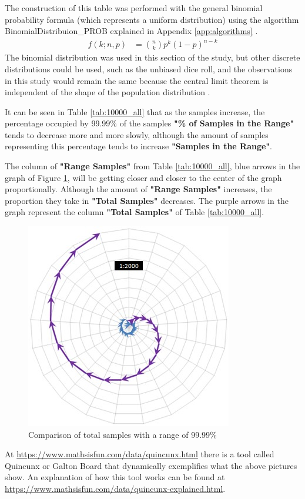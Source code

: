 The construction of this table was performed with the general binomial probability formula (which represents a uniform distribution) using the algorithm \tiny BinomialDistribuion\_PROB \normalsize explained in Appendix \ref{app:algorithms} \cite{mathisfun_binomial_distribution}.
	\begin{align*}
	f(k;n,p) &= \binom{n}{k} p^k(1 - p)^{n-k}
	\end{align*}
The binomial distribution was used in this section of the study, but other discrete distributions could be used, such as the unbiased dice roll, and the observations in this study would remain the same because the central limit theorem is independent of the shape of the population distribution \cite{statisticsbyjim_central_limit_theorem_explainded}.

It can be seen in Table \ref{tab:10000_all} that as the samples increase, the percentage occupied by 99.99\% of the samples \textbf{"\% of Samples in the Range"} tends to decrease more and more slowly, although the amount of samples representing this percentage tends to increase \textbf{"Samples in the Range"}.

The column of \textbf{"Range Samples"} from Table \ref{tab:10000_all}, blue arrows in the graph of Figure \ref{fig:total_comparison_chart_with_99_range}, will be getting closer and closer to the center of the graph proportionally. Although the amount of \textbf{"Range Samples"} increases, the proportion they take in \textbf{"Total Samples"} decreases. The purple arrows in the graph represent the column \textbf{"Total Samples"} of Table \ref{tab:10000_all}. 
	\begin{figure}[H]
	\caption{Comparison of total samples with a range of 99.99\% }
	\label{fig:total_comparison_chart_with_99_range}
	\centering
	\includegraphics[scale=.9]{sections/images/total_comparison_chart_with_99_range.jpg}
	\end{figure}

At \url{https://www.mathsisfun.com/data/quincunx.html} there is a tool called Quincunx or Galton Board that dynamically exemplifies what the above pictures show. An explanation of how this tool works can be found at \url{https://www.mathsisfun.com/data/quincunx-explained.html}. 